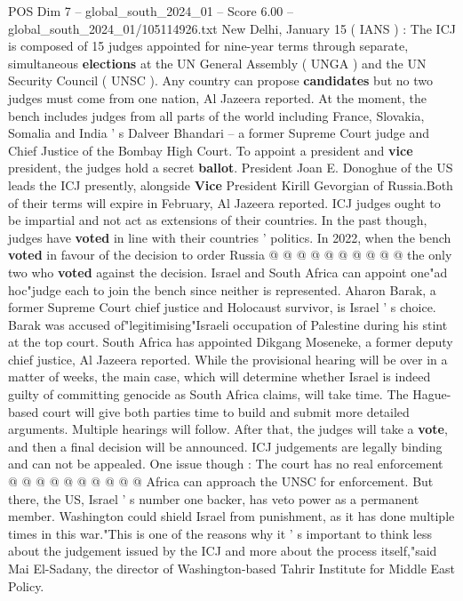 \begin{textsample}{POS Dim 7 – global\_south\_2024\_01 – Score 6.00 – global\_south\_2024\_01/105114926.txt}  \label{ex:f7_pos_310}
New Delhi, January 15 ( IANS ) : The ICJ is composed of 15 judges appointed for nine-year terms through separate, simultaneous \textbf{elections} at the UN General Assembly ( UNGA ) and the UN Security Council ( UNSC ).
Any country can propose \textbf{candidates} but no two judges must come from one nation, Al Jazeera reported.
At the moment, the bench includes judges from all parts of the world including France, Slovakia, Somalia and India ' s Dalveer Bhandari -- a former Supreme Court judge and Chief Justice of the Bombay High Court.
To appoint a president and \textbf{vice} president, the judges hold a secret \textbf{ballot}.
President Joan E.
Donoghue of the US leads the ICJ presently, alongside \textbf{Vice} President Kirill Gevorgian of Russia.Both of their terms will expire in February, Al Jazeera reported.
ICJ judges ought to be impartial and not act as extensions of their countries.
In the past though, judges have \textbf{voted} in line with their countries ' politics.
In 2022, when the bench \textbf{voted} in favour of the decision to order Russia @ @ @ @ @ @ @ @ @ @ the only two who \textbf{voted} against the decision.
Israel and South Africa can appoint one"ad hoc"judge each to join the bench since neither is represented.
Aharon Barak, a former Supreme Court chief justice and Holocaust survivor, is Israel ' s choice.
Barak was accused of"legitimising"Israeli occupation of Palestine during his stint at the top court.
South Africa has appointed Dikgang Moseneke, a former deputy chief justice, Al Jazeera reported.
While the provisional hearing will be over in a matter of weeks, the main case, which will determine whether Israel is indeed guilty of committing genocide as South Africa claims, will take time.
The Hague-based court will give both parties time to build and submit more detailed arguments.
Multiple hearings will follow.
After that, the judges will take a \textbf{vote}, and then a final decision will be announced.
ICJ judgements are legally binding and can not be appealed.
One issue though : The court has no real enforcement @ @ @ @ @ @ @ @ @ @ Africa can approach the UNSC for enforcement.
But there, the US, Israel ' s number one backer, has veto power as a permanent member.
Washington could shield Israel from punishment, as it has done multiple times in this war."This is one of the reasons why it ' s important to think less about the judgement issued by the ICJ and more about the process itself,"said Mai El-Sadany, the director of Washington-based Tahrir Institute for Middle East Policy.

\end{textsample}
